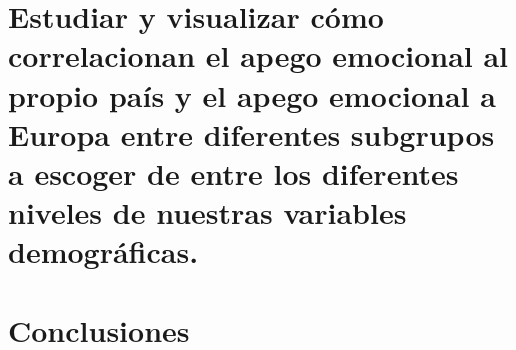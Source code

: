 \documentclass{article}
\begin{document}
\section{Estudiar y visualizar cómo correlacionan el apego emocional al propio país y el apego emocional a Europa entre diferentes subgrupos a escoger de entre los diferentes niveles de nuestras variables demográficas.}

\section*{Conclusiones}
\end{document}
